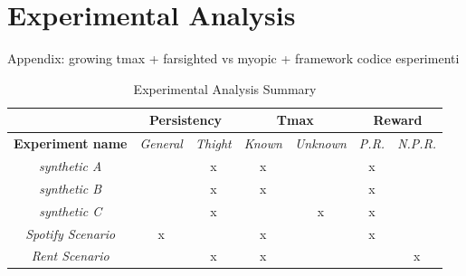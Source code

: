 \chapter{Experimental Analysis}\label{C11}

Appendix: growing tmax + farsighted vs myopic + framework codice esperimenti

\begin{table}
	\centering
	\begin{tabular}{|c|c|c|c|c|c|c|} 
		\hhline{~------|}
		\multicolumn{1}{l|}{}     & \multicolumn{2}{c|}{{\cellcolor[rgb]{0.878,0.878,0.878}}\textbf{Persistency}}                              & \multicolumn{2}{c|}{\textbf{Tmax}} & \multicolumn{2}{c|}{{\cellcolor[rgb]{0.878,0.878,0.878}}\textbf{Reward}}                                 \\ 
		\hline
		\textbf{Experiment name}  & {\cellcolor[rgb]{0.878,0.878,0.878}}\textit{General} & {\cellcolor[rgb]{0.878,0.878,0.878}}\textit{Thight} & \textit{Known} & \textit{Unknown}  & {\cellcolor[rgb]{0.878,0.878,0.878}}\textit{P.R.} & {\cellcolor[rgb]{0.878,0.878,0.878}}\textit{N.P.R.}  \\ 
		\hline
		\textit{synthetic A}      & {\cellcolor[rgb]{0.878,0.878,0.878}}                 & {\cellcolor[rgb]{0.878,0.878,0.878}}x               & x              &                   & {\cellcolor[rgb]{0.878,0.878,0.878}}x             & {\cellcolor[rgb]{0.878,0.878,0.878}}                 \\ 
		\hline
		\textit{synthetic B}      & {\cellcolor[rgb]{0.878,0.878,0.878}}                 & {\cellcolor[rgb]{0.878,0.878,0.878}}x               & x              &                   & {\cellcolor[rgb]{0.878,0.878,0.878}}x             & {\cellcolor[rgb]{0.878,0.878,0.878}}                 \\ 
		\hline
		\textit{synthetic C}      & {\cellcolor[rgb]{0.878,0.878,0.878}}                 & {\cellcolor[rgb]{0.878,0.878,0.878}}x               &                & x                 & {\cellcolor[rgb]{0.878,0.878,0.878}}x             & {\cellcolor[rgb]{0.878,0.878,0.878}}                 \\ 
		\hline
		\textit{Spotify Scenario} & {\cellcolor[rgb]{0.878,0.878,0.878}}x                & {\cellcolor[rgb]{0.878,0.878,0.878}}                & x              &                   & {\cellcolor[rgb]{0.878,0.878,0.878}}x             & {\cellcolor[rgb]{0.878,0.878,0.878}}                 \\ 
		\hline
		\textit{Rent Scenario}    & {\cellcolor[rgb]{0.878,0.878,0.878}}                 & {\cellcolor[rgb]{0.878,0.878,0.878}}x               & x              &                   & {\cellcolor[rgb]{0.878,0.878,0.878}}              & {\cellcolor[rgb]{0.878,0.878,0.878}}x                \\
		\hline
	\end{tabular}
\caption{Experimental Analysis Summary}
\end{table}
